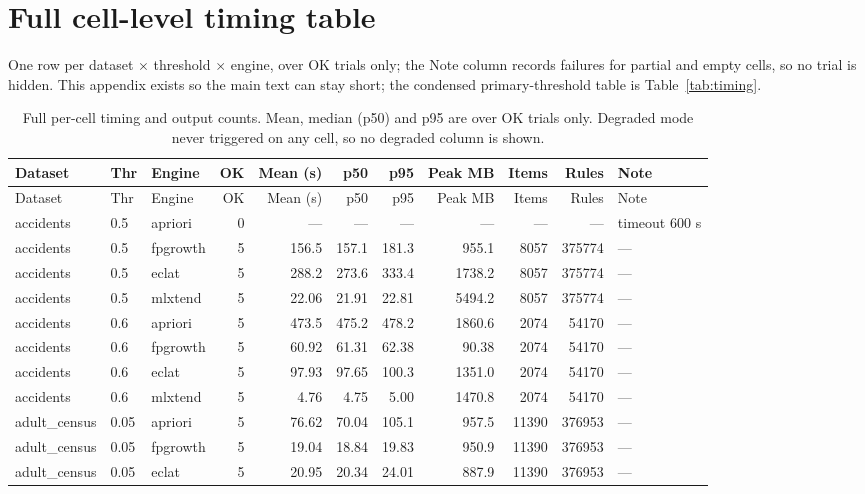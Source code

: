 \documentclass[twocolumn,10pt]{article}
\begin{document}
\clearpage
\onecolumn
\raggedbottom
\section{Full cell-level timing table}
\label{app:timing}
One row per dataset $\times$ threshold $\times$ engine, over OK trials
only; the Note column records failures for partial and empty cells, so
no trial is hidden. This appendix exists so the main text can stay
short; the condensed primary-threshold table is Table~\ref{tab:timing}.
\scriptsize
\setlength{\tabcolsep}{2pt}
\renewcommand{\arraystretch}{1.05}
\begin{longtable}{p{3.0cm}llrrrrrrrp{2.4cm}}
\caption{Full per-cell timing and output counts. Mean, median (p50) and p95 are over OK trials only. Degraded mode never triggered on any cell, so no degraded column is shown.}
\label{tab:timingfull}\\
\toprule
Dataset & Thr & Engine & OK & Mean (s) & p50 & p95 & Peak MB & Items & Rules & Note \\
\midrule
\endfirsthead
\toprule
Dataset & Thr & Engine & OK & Mean (s) & p50 & p95 & Peak MB & Items & Rules & Note \\
\midrule
\endhead
\bottomrule
\endfoot
\bottomrule
\endlastfoot
accidents & 0.5 & apriori & 0 & --- & --- & --- & --- & --- & --- & timeout 600 s \\
accidents & 0.5 & fpgrowth & 5 & 156.5 & 157.1 & 181.3 & 955.1 & 8057 & 375774 & --- \\
accidents & 0.5 & eclat & 5 & 288.2 & 273.6 & 333.4 & 1738.2 & 8057 & 375774 & --- \\
accidents & 0.5 & mlxtend & 5 & 22.06 & 21.91 & 22.81 & 5494.2 & 8057 & 375774 & --- \\
accidents & 0.6 & apriori & 5 & 473.5 & 475.2 & 478.2 & 1860.6 & 2074 & 54170 & --- \\
accidents & 0.6 & fpgrowth & 5 & 60.92 & 61.31 & 62.38 & 90.38 & 2074 & 54170 & --- \\
accidents & 0.6 & eclat & 5 & 97.93 & 97.65 & 100.3 & 1351.0 & 2074 & 54170 & --- \\
accidents & 0.6 & mlxtend & 5 & 4.76 & 4.75 & 5.00 & 1470.8 & 2074 & 54170 & --- \\
adult\_\allowbreak{}census & 0.05 & apriori & 5 & 76.62 & 70.04 & 105.1 & 957.5 & 11390 & 376953 & --- \\
adult\_\allowbreak{}census & 0.05 & fpgrowth & 5 & 19.04 & 18.84 & 19.83 & 950.9 & 11390 & 376953 & --- \\
adult\_\allowbreak{}census & 0.05 & eclat & 5 & 20.95 & 20.34 & 24.01 & 887.9 & 11390 & 376953 & --- \\

\end{longtable}
\end{document}
